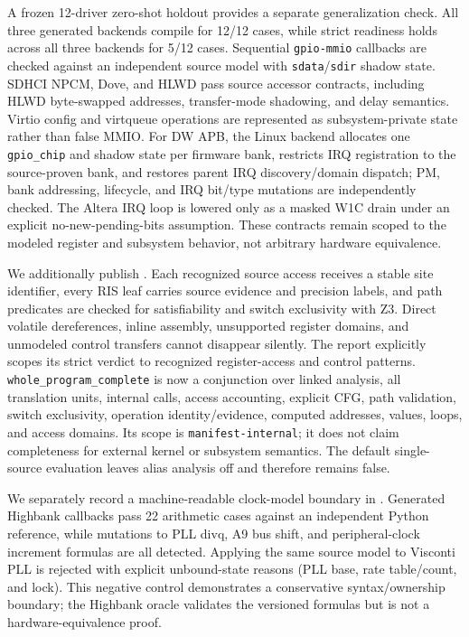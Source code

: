 \documentclass[sigplan, screen, review, anonymous]{acmart}
\begin{document}
A frozen 12-driver zero-shot holdout provides a separate generalization check. All three generated backends compile for 12/12 cases, while strict readiness holds across all three backends for 5/12 cases. Sequential \texttt{gpio-mmio} callbacks are checked against an independent source model with \texttt{sdata}/\texttt{sdir} shadow state. SDHCI NPCM, Dove, and HLWD pass source accessor contracts, including HLWD byte-swapped addresses, transfer-mode shadowing, and delay semantics. Virtio config and virtqueue operations are represented as subsystem-private state rather than false MMIO. For DW APB, the Linux backend allocates one \texttt{gpio\_chip} and shadow state per firmware bank, restricts IRQ registration to the source-proven bank, and restores parent IRQ discovery/domain dispatch; PM, bank addressing, lifecycle, and IRQ bit/type mutations are independently checked. The Altera IRQ loop is lowered only as a masked W1C drain under an explicit no-new-pending-bits assumption. These contracts remain scoped to the modeled register and subsystem behavior, not arbitrary hardware equivalence.

We additionally publish . Each recognized source access receives a stable site identifier, every RIS leaf carries source evidence and precision labels, and path predicates are checked for satisfiability and switch exclusivity with Z3. Direct volatile dereferences, inline assembly, unsupported register domains, and unmodeled control transfers cannot disappear silently. The report explicitly scopes its strict verdict to recognized register-access and control patterns. \texttt{whole\_program\_complete} is now a conjunction over linked analysis, all translation units, internal calls, access accounting, explicit CFG, path validation, switch exclusivity, operation identity/evidence, computed addresses, values, loops, and access domains. Its scope is \texttt{manifest-internal}; it does not claim completeness for external kernel or subsystem semantics. The default single-source evaluation leaves alias analysis off and therefore remains false.

We separately record a machine-readable clock-model boundary in . Generated Highbank callbacks pass 22 arithmetic cases against an independent Python reference, while mutations to PLL divq, A9 bus shift, and peripheral-clock increment formulas are all detected. Applying the same source model to Visconti PLL is rejected with explicit unbound-state reasons (PLL base, rate table/count, and lock). This negative control demonstrates a conservative syntax/ownership boundary; the Highbank oracle validates the versioned formulas but is not a hardware-equivalence proof.
\end{document}
